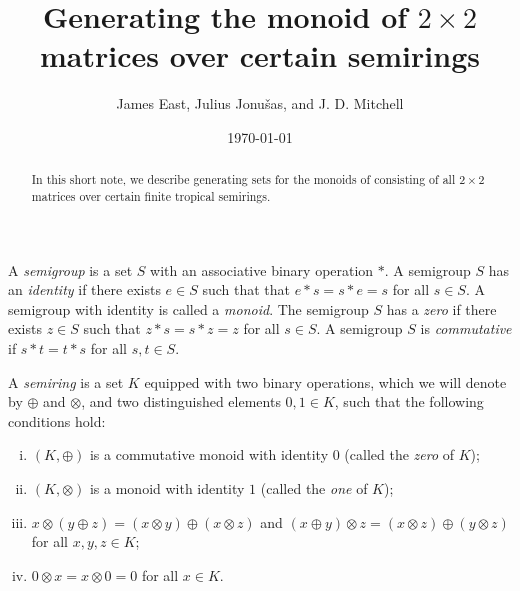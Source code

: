 \documentclass{amsart}
\title{Generating the monoid of $2 \times 2$ matrices over certain 
semirings}
\author{James East, Julius Jonu\v sas, and J. D. Mitchell}
\date{\today}
\numberwithin{equation}{section}
\theoremstyle{definition}
\begin{document}
\begin{abstract}
  In this short note, we describe generating sets for the monoids of consisting
  of all $2 \times 2$ matrices over certain finite tropical semirings. 
\end{abstract}

\maketitle

A \textit{semigroup} is a set $S$ with an associative binary operation $*$. A
semigroup $S$ has an \textit{identity} if there exists $e\in S$ such that that
$e*s = s*e = s$ for all $s\in S$. A semigroup with identity is called a
\textit{monoid}.  The semigroup $S$ has a \textit{zero} if there exists $z\in
S$ such that $z*s=s*z=z$ for all $s\in S$. A semigroup $S$ is
\textit{commutative} if $s*t = t*s$ for all $s, t\in S$. 

A \textit{semiring} is a set $K$ equipped with two binary operations, which we
will denote by $\oplus$ and $\otimes$, and two distinguished elements $0, 1\in
K$,  such that the following conditions hold:

\begin{enumerate}[(i)]

  \item 
    $(K, \oplus)$ is a commutative monoid with identity $0$ (called the
    \textit{zero} of $K$);

  \item 
    $(K, \otimes)$ is a monoid with identity $1$ (called the \textit{one} of
    $K$);

  \item 
    $x\otimes (y \oplus z) = (x\otimes y) \oplus (x \otimes z)$ and 
    $(x \oplus y)\otimes z = (x\otimes z) \oplus (y \otimes z)$ for all $x, y,
    z \in K$;

  \item 
    $0\otimes x = x \otimes 0 = 0$ for all $x\in K$. 

\end{enumerate}
\end{document}
